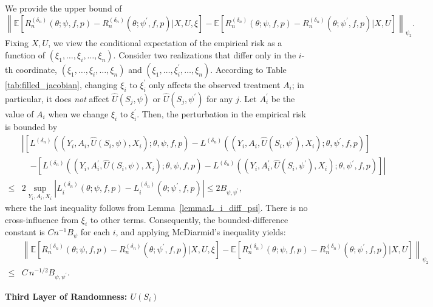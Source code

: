 \documentclass[12pt]{article}
\newcommand{\E}{\mathbb{E}}
\begin{document}
\noindent We provide the upper bound of
$$\left\|\E\left[R_n^{(\delta_n)}(\theta;\psi,f,p)-R_n^{({\delta_n})}(\theta;\psi^\prime,f,p)|X,U,\xi\right]-\E\left[R_n^{(\delta_n)}(\theta;\psi,f,p)-R_n^{({\delta_n})}(\theta;\psi^\prime,f,p)|X,U\right]\right\|_{\psi_2}.$$
Fixing $X,U$, we view the conditional expectation of the empirical risk as a function of $(\xi_1, \ldots,\xi_i,\ldots, \xi_n)$. Consider two realizations that differ only in the $i$-th coordinate, $(\xi_1, \ldots,\xi_i,\ldots, \xi_n)$ and $(\xi_1, \ldots,\xi_i^\prime,\ldots, \xi_n)$. According to Table \ref{tab:filled_jacobian}, changing $\xi_i$ to $\xi_i^\prime$ only affects the observed treatment $A_i$; in particular, it does \emph{not} affect $\widehat{U}(S_j,\psi)$ or $\widehat{U}(S_j,\psi^\prime)$ for any $j$. Let $A_i^\prime$ be the value of $A_i$ when we change $\xi_i$ to $\xi_i^\prime$. Then, the perturbation in the empirical risk is bounded by
\begin{align*}
&\left|\left[L^{(\delta_n)}((Y_i,A_i,\widehat U(S_i,\psi),X_i);\theta,\psi,f,p) - L^{(\delta_n)}((Y_i,A_i,\widehat U(S_i,\psi^\prime),X_i);\theta,\psi^\prime,f,p)\right]\right.\\
        &\quad\left.-\left[L^{(\delta_n)}((Y_i,A_i^\prime,\widehat U(S_i,\psi),X_i);\theta,\psi,f,p) - L^{(\delta_n)}((Y_i,A_i^\prime,\widehat U(S_i,\psi^\prime),X_i);\theta,\psi^\prime,f,p)\right]\right|\\
        \leq  & 2\sup_{Y_i,A_i,X_i}\left|L^{(\delta_n)}_i(\theta;\psi,f,p) - L^{(\delta_n)}_i(\theta;\psi^\prime,f,p)\right|
        \leq  2B_{\psi,\psi^\prime},
\end{align*}
where the last inequality follows from Lemma~\ref{lemma:L_i_diff_psi}. There is no cross-influence from $\xi_i$ to other terms. Consequently, the bounded-difference constant is $Cn^{-1}B_\psi$ for each $i$, and applying McDiarmid's inequality yields:
\begin{align*}
    &\left\|\E\left[R_n^{(\delta_n)}(\theta;\psi,f,p)-R_n^{({\delta_n})}(\theta;\psi^\prime,f,p)|X,U,\xi\right]-\E\left[R_n^{(\delta_n)}(\theta;\psi,f,p)-R_n^{({\delta_n})}(\theta;\psi^\prime,f,p)|X,U\right]\right\|_{\psi_2}\\
    \leq & C\, n^{-1/2} B_{\psi,\psi^\prime}.
\end{align*}

\noindent\textbf{Third Layer of Randomness: $U(S_i)$}
\end{document}
